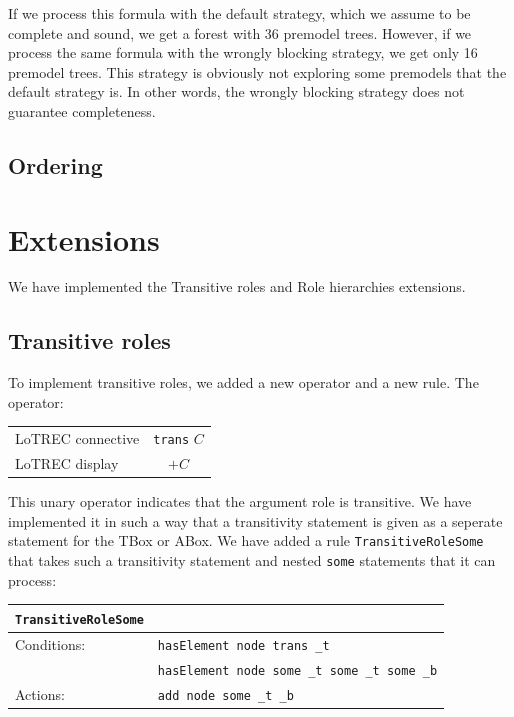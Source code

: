\documentclass[11pt]{article} %
\begin{document}
If we process this formula with the default strategy, which we assume to be complete and sound, we get a forest with 36 premodel trees. However, if we process the same formula with the wrongly blocking strategy, we get only 16 premodel trees. This strategy is obviously not exploring some premodels that the default strategy is. In other words, the wrongly blocking strategy does not guarantee completeness.

\subsection{Ordering}

\section{Extensions}
\label{sec:extensions}

We have implemented the Transitive roles and Role hierarchies extensions.

\subsection{Transitive roles}

To implement transitive roles, we added a new operator and a new rule. The operator:

\begin{table}[h]
\begin{center}
\begin{tabular}{l c}
LoTREC connective & \texttt{trans} $C$ \\
LoTREC display & $+C$ \\
\end{tabular}
\end{center}
\end{table}

This unary operator indicates that the argument role is transitive. We have implemented it in such a way that a transitivity statement is given as a seperate statement for the TBox or ABox. We have added a rule \texttt{TransitiveRoleSome} that takes such a transitivity statement and nested \texttt{some} statements that it can process:

\begin{table}[h]
\begin{center}
\begin{tabular}{l l}
\texttt{TransitiveRoleSome} & \\
\hline
Conditions: & \texttt{hasElement node trans \_t} \\
 & \texttt{hasElement node some \_t some \_t some \_b} \\
Actions: & \texttt{add node some \_t \_b} \\
\hline
\end{tabular}
\end{center}
\end{table}
\end{document}

